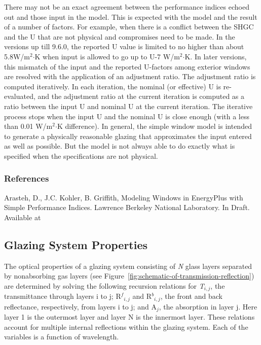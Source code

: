 There may not be an exact agreement between the performance indices echoed out and
those input in the model. This is expected with the model and the result of a
number of factors. For example, when there is a conflict between the SHGC and the
U that are not physical and compromises need to be made. In the versions up till
9.6.0, the reported U value is limited to no higher than about 5.8W/m\(^{2}\)\(\cdot\)K
when input is allowed to go up to U-7 W/m\(^{2}\)\(\cdot\)K. In later versions,
this mismatch of the input and the reported U-factors among exterior windows
are resolved with the application of an adjustment ratio. The adjustment ratio
is computed iteratively. In each iteration, the nominal (or effective) U is
re-evaluated, and the adjustment ratio at the current iteration is computed as
a ratio between the input U and nominal U at the current iteration. The iterative
process stops when the input U and the nominal U is close enough (with a less than
0.01 W/m\(^{2}\)\(\cdot\)K difference). In general, the simple window
model is intended to generate a physically reasonable glazing that approximates
the input entered as well as possible. But the model is not always able to
do exactly what is specified when the specifications are not physical.

\subsubsection{References}\label{references-054}

Arasteh, D., J.C. Kohler, B. Griffith, Modeling Windows in EnergyPlus with Simple Performance Indices. Lawrence Berkeley National Laboratory. In Draft. Available at

\subsection{Glazing System Properties}\label{glazing-system-properties}

The optical properties of a glazing system consisting of \emph{N} glass layers separated by nonabsorbing gas layers (see Figure~\ref{fig:schematic-of-transmission-reflection}) are determined by solving the following recursion relations for \emph{T\(_{i,j}\)}, the transmittance through layers i to j; {R\(^{f}\)\(_{i,j}\)} and {R\(^{b}\)\(_{i,j}\)}, the front and back reflectance, respectively, from layers i to j; and A\(_{j}\), the absorption in layer j. Here layer 1 is the outermost layer and layer N is the innermost layer. These relations account for multiple internal reflections within the glazing system. Each of the variables is a function of wavelength.

